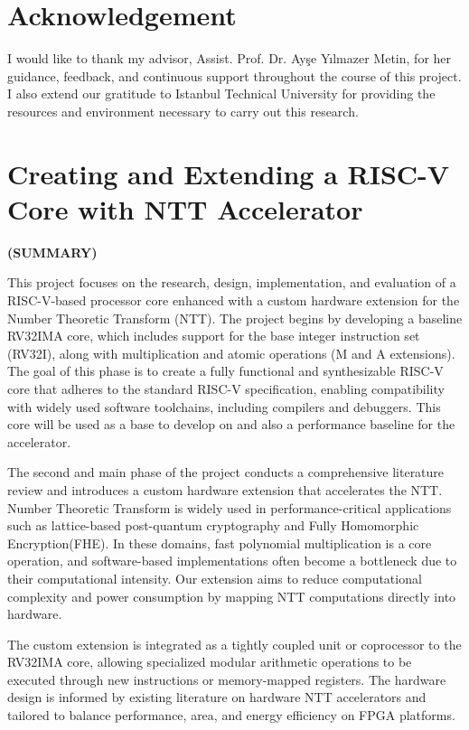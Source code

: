 \documentclass[a4paper, 12pt, titlepage]{article}
\newcommand{\thetitle}{Creating and Extending a RISC-V Core with NTT Accelerator}
\begin{document}
\newpage
\section*{Acknowledgement}

I would like to thank my advisor, Assist. Prof. Dr. Ayşe Yılmazer Metin, for her guidance, feedback, and continuous support throughout the course of this project. I also extend our gratitude to Istanbul Technical University for providing the resources and environment necessary to carry out this research.

\newpage
\section*{\centering\thetitle}
\centerline{\fontsize{16pt}{21.6pt}\sffamily\bfseries (SUMMARY)}

This project focuses on the research, design, implementation, and evaluation of a RISC-V-based processor core enhanced with a custom hardware extension for the Number Theoretic Transform (NTT). The project begins by developing a baseline RV32IMA core, which includes support for the base integer instruction set (RV32I), along with multiplication and atomic operations (M and A extensions). The goal of this phase is to create a fully functional and synthesizable RISC-V core that adheres to the standard RISC-V specification, enabling compatibility with widely used software toolchains, including compilers and debuggers. This core will be used as a base to develop on and also a performance baseline for the accelerator.

The second and main phase of the project conducts a comprehensive literature review and introduces a custom hardware extension that accelerates the NTT. Number Theoretic Transform is widely used in performance-critical applications such as lattice-based post-quantum cryptography and Fully Homomorphic Encryption(FHE). In these domains, fast polynomial multiplication is a core operation, and software-based implementations often become a bottleneck due to their computational intensity. Our extension aims to reduce computational complexity and power consumption by mapping NTT computations directly into hardware. 

The custom extension is integrated as a tightly coupled unit or coprocessor to the RV32IMA core, allowing specialized modular arithmetic operations to be executed through new instructions or memory-mapped registers. The hardware design is informed by existing literature on hardware NTT accelerators and tailored to balance performance, area, and energy efficiency on FPGA platforms.
\end{document}
